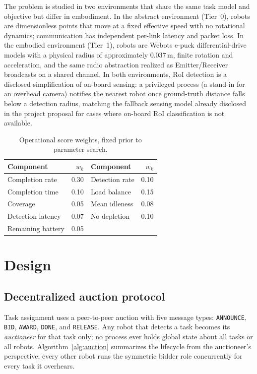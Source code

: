 \documentclass[conference]{IEEEtran}
\begin{document}
The problem is studied in two environments that share the same task
model and objective but differ in embodiment. In the abstract
environment (Tier~0), robots are dimensionless points that move at a
fixed effective speed with no rotational dynamics; communication has
independent per-link latency and packet loss. In the embodied environment
(Tier~1), robots are Webots e-puck differential-drive models with a
physical radius of approximately $0.037\,\mathrm{m}$, finite rotation and
acceleration, and the same radio abstraction realized as
Emitter/Receiver broadcasts on a shared channel. In both environments,
RoI detection is a disclosed simplification of on-board sensing: a
privileged process (a stand-in for an overhead camera) notifies the
nearest robot once ground-truth distance falls below a detection radius,
matching the fallback sensing model already disclosed in the project
proposal for cases where on-board RoI classification is not available.

\begin{table}[t]
\centering
\caption{Operational score weights, fixed prior to parameter search.}
\label{tab:score}
\begin{tabular}{@{}lr@{\qquad}lr@{}}
\toprule
Component & $w_k$ & Component & $w_k$\\
\midrule
Completion rate & 0.30 & Detection rate & 0.10\\
Completion time & 0.10 & Load balance & 0.15\\
Coverage & 0.05 & Mean idleness & 0.08\\
Detection latency & 0.07 & No depletion & 0.10\\
Remaining battery & 0.05 & & \\
\bottomrule
\end{tabular}
\end{table}

\section{Design}

\subsection{Decentralized auction protocol}

Task assignment uses a peer-to-peer auction with five message types:
\texttt{ANNOUNCE}, \texttt{BID}, \texttt{AWARD}, \texttt{DONE}, and
\texttt{RELEASE}. Any robot that detects a task becomes its
\emph{auctioneer} for that task only; no process ever holds global state
about all tasks or all robots. Algorithm~\ref{alg:auction} summarizes the
lifecycle from the auctioneer's perspective; every other robot runs the
symmetric bidder role concurrently for every task it overhears.
\end{document}
